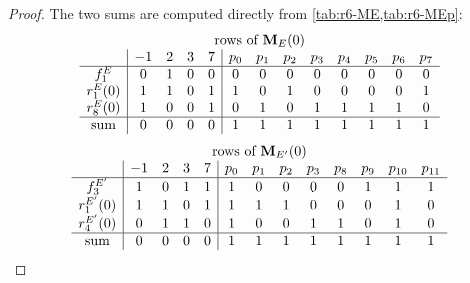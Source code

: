 \documentclass[12pt,oneside,openany]{book}
\theoremstyle{definition}
\theoremstyle{plain}
\numberwithin{equation}{chapter}
\theoremstyle{plain}
\theoremstyle{definition}
\theoremstyle{remark}
\begin{document}
\begin{proof}
The two sums are computed directly from \cref{tab:r6-ME,tab:r6-MEp}:
\[
\begin{array}{c|cccc|cccccccc}
\multicolumn{13}{c}{\text{rows of }\mathbf M_E(0)}\\
 & -1 & 2 & 3 & 7 & p_0 & p_1 & p_2 & p_3 & p_4 & p_5 & p_6 & p_7\\
\hline
f^E_1 & 0 & 1 & 0 & 0 & 0 & 0 & 0 & 0 & 0 & 0 & 0 & 0 \\
r^{E}_1(0) & 1 & 1 & 0 & 1 & 1 & 0 & 1 & 0 & 0 & 0 & 0 & 1 \\
r^{E}_8(0) & 1 & 0 & 0 & 1 & 0 & 1 & 0 & 1 & 1 & 1 & 1 & 0 \\
\hline
\text{sum} & 0 & 0 & 0 & 0 & 1 & 1 & 1 & 1 & 1 & 1 & 1 & 1
\end{array}
\]
\[
\begin{array}{c|cccc|cccccccc}
\multicolumn{13}{c}{\text{rows of }\mathbf M_{E'}(0)}\\
 & -1 & 2 & 3 & 7 & p_0 & p_1 & p_2 & p_3 & p_8 & p_9 & p_{10} & p_{11}\\
\hline
f^{E'}_3 & 1 & 0 & 1 & 1 & 1 & 0 & 0 & 0 & 0 & 1 & 1 & 1 \\
r^{E'}_1(0) & 1 & 1 & 0 & 1 & 1 & 1 & 1 & 0 & 0 & 0 & 1 & 0 \\
r^{E'}_4(0) & 0 & 1 & 1 & 0 & 1 & 0 & 0 & 1 & 1 & 0 & 1 & 0 \\
\hline
\text{sum} & 0 & 0 & 0 & 0 & 1 & 1 & 1 & 1 & 1 & 1 & 1 & 1
\end{array}
\]


\end{proof}
\end{document}
